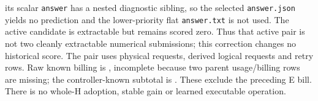 its scalar \texttt{answer} has a nested diagnostic sibling, so the selected
\texttt{answer.json} yields no prediction and the lower-priority flat
\texttt{answer.txt} is not used. The active candidate is extractable but
remains scored zero. Thus that active pair is not two cleanly extractable
numerical submissions; this correction changes no historical score.
The pair uses \BacktestWorkerUnitPairRequests{} physical requests,
\BacktestWorkerUnitPairLogicalRequests{} derived logical requests and
\BacktestWorkerUnitPairRetries{} retry rows. Raw known billing is
\BacktestWorkerUnitPairKnownCost{}, incomplete because two parent usage/billing
rows are missing; the controller-known subtotal is
\BacktestWorkerUnitPairControllerCost{}. These exclude the preceding E bill.
There is no whole-H adoption, stable gain or learned executable operation.

